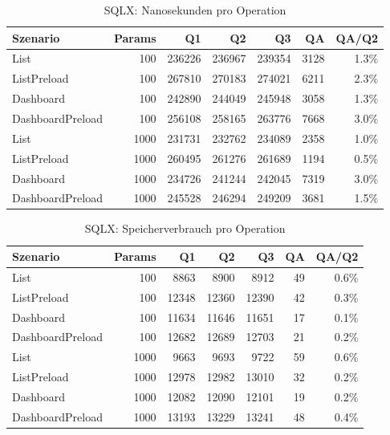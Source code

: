 
\begin{table}[ht]
\caption{SQLX: Nanosekunden pro Operation}
\begin{tabular}{lrrrrrr}
\toprule
Szenario & Params & Q1 & Q2 & Q3 & QA & QA/Q2 \\
\midrule
	List & 100 & 236226 & 236967 & 239354 & 3128 & 1.3\% \\
	ListPreload & 100 & 267810 & 270183 & 274021 & 6211 & 2.3\% \\
	Dashboard & 100 & 242890 & 244049 & 245948 & 3058 & 1.3\% \\
	DashboardPreload & 100 & 256108 & 258165 & 263776 & 7668 & 3.0\% \\
	List & 1000 & 231731 & 232762 & 234089 & 2358 & 1.0\% \\
	ListPreload & 1000 & 260495 & 261276 & 261689 & 1194 & 0.5\% \\
	Dashboard & 1000 & 234726 & 241244 & 242045 & 7319 & 3.0\% \\
	DashboardPreload & 1000 & 245528 & 246294 & 249209 & 3681 & 1.5\% \\
\bottomrule
\end{tabular}
\label{tab:benchmark_sqlx_nsperop}
\end{table}
	
\begin{table}[ht]
\caption{SQLX: Speicherverbrauch pro Operation}
\begin{tabular}{lrrrrrr}
\toprule
Szenario & Params & Q1 & Q2 & Q3 & QA & QA/Q2 \\
\midrule
	List & 100 & 8863 & 8900 & 8912 & 49 & 0.6\% \\
	ListPreload & 100 & 12348 & 12360 & 12390 & 42 & 0.3\% \\
	Dashboard & 100 & 11634 & 11646 & 11651 & 17 & 0.1\% \\
	DashboardPreload & 100 & 12682 & 12689 & 12703 & 21 & 0.2\% \\
	List & 1000 & 9663 & 9693 & 9722 & 59 & 0.6\% \\
	ListPreload & 1000 & 12978 & 12982 & 13010 & 32 & 0.2\% \\
	Dashboard & 1000 & 12082 & 12090 & 12101 & 19 & 0.2\% \\
	DashboardPreload & 1000 & 13193 & 13229 & 13241 & 48 & 0.4\% \\
\bottomrule
\end{tabular}
\label{tab:benchmark_sqlx_bytesperop}
\end{table}
	
